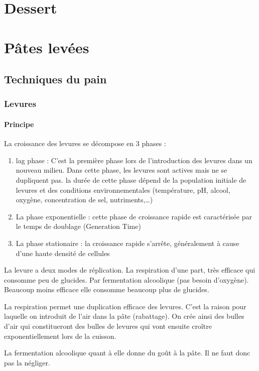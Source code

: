 \documentclass[a4paper,twoside,openright]{report}
\begin{document}
\chapter{Dessert}
\minitoc



\chapter{Pâtes levées}
\minitoc

\newpage
\section{Techniques du pain}
\subsection{Levures}
\subsubsection{Principe}
La croissance des levures se décompose en 3 phases :
\begin{enumerate}
\item lag phase : C'est la première phase lors de l'introduction des levures dans un nouveau milieu. Dans cette phase, les levures sont actives mais ne se dupliquent pas. la durée de cette phase dépend de la population initiale de levures et des conditions environnementales (température, pH, alcool, oxygène, concentration de sel, nutriments,\dots)
\item La phase exponentielle : cette phase de croissance rapide est caractérisée par le temps de doublage (Generation Time)
\item La phase stationaire : la croissance rapide s'arrête, généralement à cause d'une haute densité de cellules
\end{enumerate}

La levure a deux modes de réplication. La respiration d'une part, très efficace qui consomme peu de glucides. Par fermentation 
alcoolique (pas besoin d'oxygène). Beaucoup moins efficace elle consomme beaucoup plus de glucides. 

La respiration permet une 
duplication efficace des levures. C'est la raison pour laquelle on introduit de l'air dans la pâte (rabattage). On crée ainsi 
des bulles d'air qui constitueront des bulles de levures qui vont ensuite croître exponentiellement lors de la cuisson. 

La fermentation alcoolique quant à elle donne du goût à la pâte. Il ne faut donc pas la négliger. 
\end{document}
